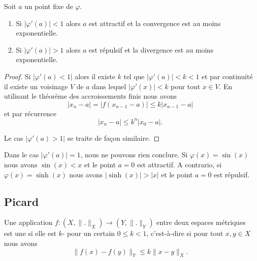 \begin{lemma}
	Soit \( a\) un point fixe de \( \varphi\).
	\begin{enumerate}
		\item
		      Si \( | \varphi'(a) |<1\) alors \( a\) est attractif et la convergence est au moins exponentielle.
		\item
		      Si \( | \varphi'(a) |>1\) alors \( a\) est répulsif et la divergence est au moins exponentielle.
	\end{enumerate}
\end{lemma}

\begin{proof}
	Si \( | \varphi'(a)<1 |\) alors il existe \( k\) tel que \( | \varphi'(a) |<k<1\) et par continuité il existe un voisinage \( V\) de \( a\) dans lequel \( | \varphi'(x) |<k\) pour tout \( x\in V\). En utilisant le théorème des accroissements finis nous avons
	\begin{equation}
		| x_n-a |=\big| f(x_{n-1}-a) \big|\leq k| x_{n-1}-a |
	\end{equation}
	et par récurrence
	\begin{equation}
		| x_n-a |\leq k^n| x_0-a |.
	\end{equation}

	Le cas \( | \varphi'(a)>1 |\) se traite de façon similaire.
\end{proof}

\begin{remark}
	Dans le cas \(| \varphi'(a) |=1\), nous ne pouvons rien conclure. Si \( \varphi(x)=\sin(x)\) nous avons \( \sin(x)<x\) et le point \( a=0\) est attractif. A contrario, si \( \varphi(x)=\sinh(x)\) nous avons \( |\sinh(x)|>|x|\) et le point \( a=0\) est répulsif.
\end{remark}

\subsection{Picard}

\begin{definition}      \label{DEFooRSLCooAsWisu}
	Une application \( f\colon (X,\| . \|_X)\to (Y,\| . \|_Y)\) entre deux espaces métriques est une  si elle est \( k\)- pour un certain \( 0\leq k<1\), c'est-à-dire si pour tout \( x,y\in X\) nous avons
	\begin{equation}
		\| f(x)-f(y) \|_Y\leq k\| x-y \|_{X}.
	\end{equation}
\end{definition}

